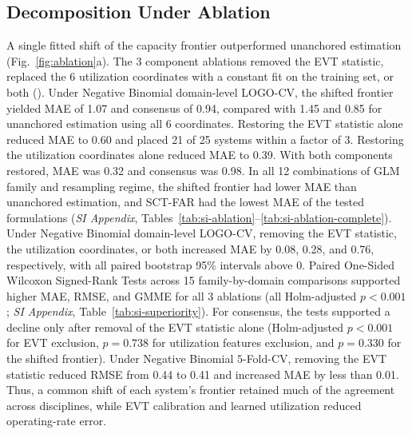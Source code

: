 \documentclass{article}
\begin{document}
\subsection*{Decomposition Under Ablation}
\label{sub-sec:conversion}
A single fitted shift of the capacity frontier outperformed unanchored estimation (Fig.~\ref{fig:ablation}a). The 3 component ablations removed the EVT statistic, replaced the 6 utilization coordinates with a constant fit on the training set, or both (). Under Negative Binomial domain-level LOGO-CV, the shifted frontier yielded MAE of 1.07 and consensus of 0.94, compared with 1.45 and 0.85 for unanchored estimation using all 6 coordinates. Restoring the EVT statistic alone reduced MAE to 0.60 and placed 21 of 25 systems within a factor of 3. Restoring the utilization coordinates alone reduced MAE to 0.39. With both components restored, MAE was 0.32 and consensus was 0.98. In all 12 combinations of GLM family and resampling regime, the shifted frontier had lower MAE than unanchored estimation, and SCT-FAR had the lowest MAE of the tested formulations (\textit{SI Appendix}, Tables~\ref{tab:si-ablation}--\ref{tab:si-ablation-complete}). Under Negative Binomial domain-level LOGO-CV, removing the EVT statistic, the utilization coordinates, or both increased MAE by 0.08, 0.28, and 0.76, respectively, with all paired bootstrap 95\% intervals above 0. Paired One-Sided Wilcoxon Signed-Rank Tests across 15 family-by-domain comparisons supported higher MAE, RMSE, and GMME for all 3 ablations (all Holm-adjusted $p < 0.001$; \textit{SI Appendix}, Table~\ref{tab:si-superiority}). For consensus, the tests supported a decline only after removal of the EVT statistic alone (Holm-adjusted $p < 0.001$ for EVT exclusion, $p = 0.738$ for utilization features exclusion, and $p = 0.330$ for the shifted frontier). Under Negative Binomial $5$-Fold-CV, removing the EVT statistic reduced RMSE from 0.44 to 0.41 and increased MAE by less than 0.01. Thus, a common shift of each system's frontier retained much of the agreement across disciplines, while EVT calibration and learned utilization reduced operating-rate error.
\end{document}
